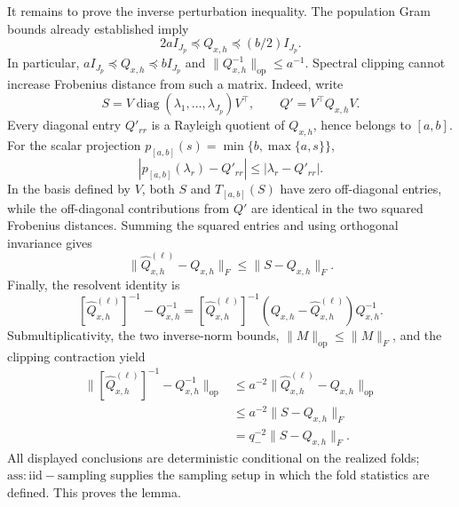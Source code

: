It remains to prove the inverse perturbation inequality. The population Gram bounds already established imply
\[
 2aI_{J_p}\preceq Q_{x,h}\preceq(b/2)I_{J_p}.
\]
In particular, \(aI_{J_p}\preceq Q_{x,h}\preceq bI_{J_p}\) and \(\lVert Q_{x,h}^{-1}\rVert_{\mathrm{op}}\le a^{-1}\). Spectral clipping cannot increase Frobenius distance from such a matrix. Indeed, write
\[
 S=V\operatorname{diag}(\lambda_1,\ldots,\lambda_{J_p})V^\top,
 \qquad Q'=V^\top Q_{x,h}V.
\]
Every diagonal entry \(Q'_{rr}\) is a Rayleigh quotient of \(Q_{x,h}\), hence belongs to \([a,b]\). For the scalar projection \(p_{[a,b]}(s)=\min\{b,\max\{a,s\}\}\),
\[
 |p_{[a,b]}(\lambda_r)-Q'_{rr}|\le|\lambda_r-Q'_{rr}|.
\]
In the basis defined by \(V\), both \(S\) and \(T_{[a,b]}(S)\) have zero off-diagonal entries, while the off-diagonal contributions from \(Q'\) are identical in the two squared Frobenius distances. Summing the squared entries and using orthogonal invariance gives
\[
 \lVert\widehat Q^{(\ell)}_{x,h}-Q_{x,h}\rVert_F
 \le\lVert S-Q_{x,h}\rVert_F.
\]
Finally, the resolvent identity is
\[
 [\widehat Q^{(\ell)}_{x,h}]^{-1}-Q_{x,h}^{-1}
 = [\widehat Q^{(\ell)}_{x,h}]^{-1}
 (Q_{x,h}-\widehat Q^{(\ell)}_{x,h})Q_{x,h}^{-1}.
\]
Submultiplicativity, the two inverse-norm bounds, \(\lVert M\rVert_{\mathrm{op}}\le\lVert M\rVert_F\), and the clipping contraction yield
\[
\begin{aligned}
 \bigl\lVert[\widehat Q^{(\ell)}_{x,h}]^{-1}-Q_{x,h}^{-1}\bigr\rVert_{\mathrm{op}}
 &\le a^{-2}\lVert\widehat Q^{(\ell)}_{x,h}-Q_{x,h}\rVert_{\mathrm{op}}\\
 &\le a^{-2}\lVert S-Q_{x,h}\rVert_F\\
 &=q_-^{-2}\lVert S-Q_{x,h}\rVert_F.
\end{aligned}
\]
All displayed conclusions are deterministic conditional on the realized folds; \(\mathrm{ass:iid-sampling}\) supplies the sampling setup in which the fold statistics are defined. This proves the lemma.
